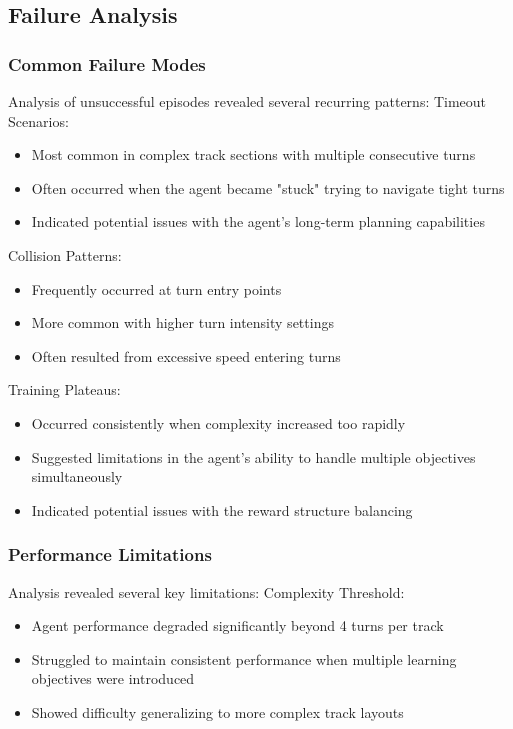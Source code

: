 \documentclass[10pt,twocolumn]{article}
\begin{document}
\subsection{Failure Analysis}
\subsubsection{Common Failure Modes}
Analysis of unsuccessful episodes revealed several recurring patterns:
Timeout Scenarios:
\begin{itemize}
    \item Most common in complex track sections with multiple consecutive turns
    \item Often occurred when the agent became "stuck" trying to navigate tight turns
    \item Indicated potential issues with the agent's long-term planning capabilities
\end{itemize}

Collision Patterns:
\begin{itemize}
    \item Frequently occurred at turn entry points
    \item More common with higher turn intensity settings
    \item Often resulted from excessive speed entering turns
\end{itemize}

Training Plateaus:
\begin{itemize}
    \item Occurred consistently when complexity increased too rapidly
    \item Suggested limitations in the agent's ability to handle multiple objectives simultaneously
    \item Indicated potential issues with the reward structure balancing
\end{itemize}

\subsubsection{Performance Limitations}
Analysis revealed several key limitations:
Complexity Threshold:
\begin{itemize}
    \item Agent performance degraded significantly beyond 4 turns per track
    \item Struggled to maintain consistent performance when multiple learning objectives were introduced
    \item Showed difficulty generalizing to more complex track layouts
\end{itemize}
\end{document}
